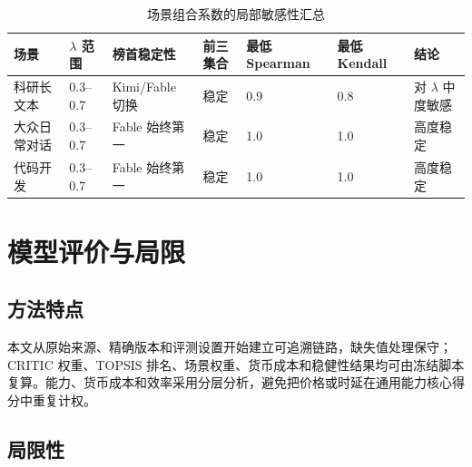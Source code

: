 \documentclass[UTF8,zihao=-4,a4paper,fontset=none]{ctexart}
\begin{document}
\begin{table}[H]
  \centering
  \caption{场景组合系数的局部敏感性汇总}
  \label{tab:lambda-sensitivity}
  \begin{tabularx}{\textwidth}{L{2.2cm}C{1.5cm}L{3.2cm}C{1.5cm}C{1.5cm}C{1.5cm}X}
    \toprule
    场景 & $\lambda$ 范围 & 榜首稳定性 & 前三集合 & 最低 Spearman & 最低 Kendall & 结论 \\
    \midrule
    科研长文本 & 0.3--0.7 & Kimi/Fable 切换 & 稳定 & 0.9 & 0.8 & 对 $\lambda$ 中度敏感 \\
    大众日常对话 & 0.3--0.7 & Fable 始终第一 & 稳定 & 1.0 & 1.0 & 高度稳定 \\
    代码开发 & 0.3--0.7 & Fable 始终第一 & 稳定 & 1.0 & 1.0 & 高度稳定 \\
    \bottomrule
  \end{tabularx}
\end{table}

\section{模型评价与局限}

\subsection{方法特点}

本文从原始来源、精确版本和评测设置开始建立可追溯链路，缺失值处理保守；CRITIC 权重、TOPSIS 排名、场景权重、货币成本和稳健性结果均可由冻结脚本复算。能力、货币成本和效率采用分层分析，避免把价格或时延在通用能力核心得分中重复计权。

\subsection{局限性}
\end{document}
